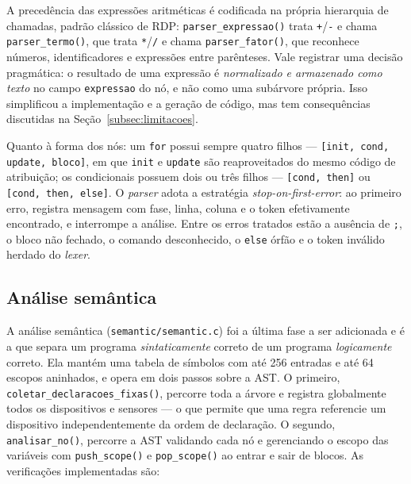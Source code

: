 \documentclass[conference]{IEEEtran}
\begin{document}
A precedência das expressões aritméticas é codificada na própria
hierarquia de chamadas, padrão clássico de RDP:
\texttt{parser\_expressao()} trata \texttt{+}/\texttt{-} e chama
\texttt{parser\_termo()}, que trata \texttt{*}/\texttt{/} e chama
\texttt{parser\_fator()}, que reconhece números, identificadores e
expressões entre parênteses. Vale registrar uma decisão pragmática: o
resultado de uma expressão é \emph{normalizado e armazenado como texto} no
campo \texttt{expressao} do nó, e não como uma subárvore própria. Isso
simplificou a implementação e a geração de código, mas tem consequências
discutidas na Seção~\ref{subsec:limitacoes}.

Quanto à forma dos nós: um \texttt{for} possui sempre quatro filhos
--- \texttt{[init, cond, update, bloco]}, em que \texttt{init} e
\texttt{update} são reaproveitados do mesmo código de atribuição; os
condicionais possuem dois ou três filhos --- \texttt{[cond, then]} ou
\texttt{[cond, then, else]}. O \emph{parser} adota a estratégia
\emph{stop-on-first-error}: ao primeiro erro, registra mensagem com fase,
linha, coluna e o token efetivamente encontrado, e interrompe a análise.
Entre os erros tratados estão a ausência de \texttt{;}, o bloco não
fechado, o comando desconhecido, o \texttt{else} órfão e o token inválido
herdado do \emph{lexer}.

\subsection{Análise semântica}

A análise semântica (\texttt{semantic/semantic.c}) foi a última fase a ser
adicionada e é a que separa um programa \emph{sintaticamente} correto de um
programa \emph{logicamente} correto. Ela mantém uma tabela de símbolos com
até 256 entradas e até 64 escopos aninhados, e opera em dois passos sobre
a AST. O primeiro, \texttt{coletar\_declaracoes\_fixas()}, percorre toda a
árvore e registra globalmente todos os dispositivos e sensores --- o que
permite que uma regra referencie um dispositivo independentemente da ordem
de declaração. O segundo, \texttt{analisar\_no()}, percorre a AST validando
cada nó e gerenciando o escopo das variáveis com \texttt{push\_scope()} e
\texttt{pop\_scope()} ao entrar e sair de blocos. As verificações
implementadas são:
\end{document}
